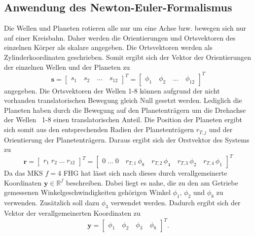 \subsection{Anwendung des Newton-Euler-Formalismus}\label{ssec:AnwNE}
Die Wellen und Planeten rotieren alle nur um eine Achse bzw. bewegen sich nur auf einer Kreisbahn. Daher werden die Orientierungen und Ortsvektoren des einzelnen Körper als skalare angegeben. Die Ortsvektoren werden als Zylinderkoordinaten geschrieben. Somit ergibt sich der Vektor der Orientierungen der einzelnen Wellen und der Planeten zu 
\begin{equation}
\pmb{s} = \begin{bmatrix} s_{1}\quad s_{2}\quad \dots \quad s_{12} \end{bmatrix}^T = \begin{bmatrix} \phi_{1}\quad \phi_{2}\quad \dots \quad \phi_{12} \end{bmatrix}^T
\end{equation}
angegeben. 
Die Ortsvektoren der Wellen 1-8 können aufgrund der nicht vorhanden translatorischen Bewegung gleich Null gesetzt werden. Lediglich die Planeten haben durch die Bewegung auf den Planetenträgern um die Drehachse der Wellen~ 1-8 einen translatorischen Anteil. Die Position der Planeten ergibt sich somit aus den entsprechenden Radien der Planetenträgern $r_{T,j}$ und der Orientierung der Planetenträgern. Daraus ergibt sich der Orstvektor des Systems zu
\begin{equation}
\pmb{r} = \begin{bmatrix} r_{1}\; r_{2}\; \dots \; r_{12} \end{bmatrix}^T = \begin{bmatrix} 0\; \dots \; 0 \quad r_{T,1}\,\phi_8 \quad r_{T,2}\,\phi_4 \quad r_{T,3}\,\phi_2 \quad r_{T,4}\,\phi_1 \end{bmatrix}^T
\end{equation}
Da das MKS $f=4$ FHG hat lässt sich nach \cite{Schiehlen.2017} dieses durch verallgemeinerte Koordinaten $\pmb{y}\in \mathbb{R}^f$ beschreiben. Dabei liegt es nahe, die zu den am Getriebe gemessenen Winkelgeschwindigkeiten gehörigen Winkel $\phi_{1}$, $\phi_{2}$ und $\phi_{8}$ zu verwenden. Zusätzlich soll dazu $\phi_{3}$ verwendet werden. Dadurch ergibt sich der Vektor der verallgemeinerten Koordinaten zu
\begin{equation}
\pmb{y} = \begin{bmatrix} \phi_{1}\quad \phi_{2}\quad \phi_{3}\quad \phi_{8} \end{bmatrix}^T.
\end{equation}
